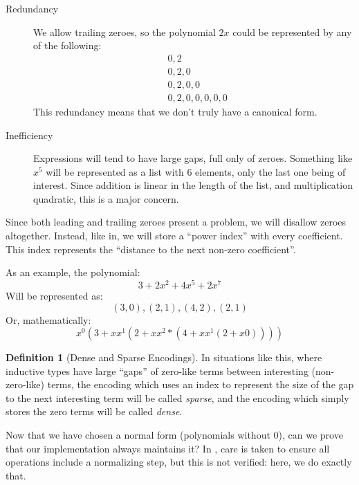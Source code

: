 \documentclass[draft, twocolumn]{article}
\theoremstyle{definition}
\newtheorem{definition}{Definition}[section]
\theoremstyle{definition}
\begin{document}
\begin{description}
  \item[Redundancy] We allow trailing zeroes, so the polynomial $2x$ could be
    represented by any of the following:
    \begin{align*}
      & 0, 2 \\
      & 0, 2, 0 \\
      & 0, 2, 0, 0 \\
      & 0, 2, 0, 0, 0, 0, 0
    \end{align*}
    This redundancy means that we don't truly have a canonical form.
  \item[Inefficiency] Expressions will tend to have large gaps, full only of
    zeroes. Something like $x^5$ will be represented as a list with 6 elements,
    only the last one being of interest. Since addition is linear in the length
    of the list, and multiplication quadratic, this is a major concern.
\end{description}
Since both leading and trailing zeroes present a problem, we will disallow
zeroes altogether. Instead, like in\cite{gregoire_proving_2005}, we will store a
``power index'' with every coefficient\footnotemark. This index represents the
``distance to the next non-zero coefficient''.

As an example, the polynomial:
\[ 3 + 2x^2 + 4x^5 + 2x^7 \]
Will be represented as:
\[ (3,0),(2,1),(4,2),(2,1) \]
Or, mathematically:
\[ x^0 (3 + x x^1 (2 + x x^2 * (4 + x x^1 (2 + x 0)))) \]

\begin{definition}[Dense and Sparse Encodings]
  In situations like this, where inductive types have large ``gaps'' of
  zero-like terms between interesting (non-zero-like) terms, the encoding which
  uses an index to represent the size of the gap to the next interesting term
  will be called \emph{sparse}, and the encoding which simply stores the zero
  terms will be called \emph{dense}.
\end{definition}

Now that we have chosen a normal form (polynomials without 0), can we prove that
our implementation always maintains it? In \cite{gregoire_proving_2005}, care
is taken to ensure all operations include a normalizing step, but this is not
verified: here, we do exactly that.
\end{document}
